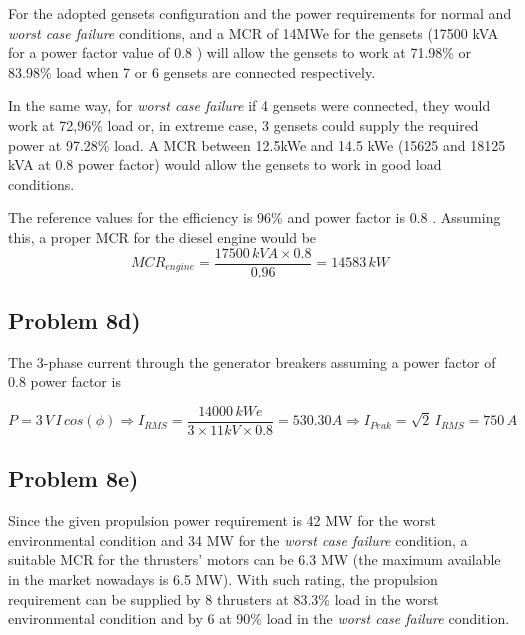 For the adopted gensets configuration and the power requirements for normal and \textit{worst case failure} conditions, and a MCR of 14MWe for the gensets (17500 kVA for a power factor value of 0.8 \cite{CatGenerators}) will allow the gensets to work at 71.98\% or 83.98\% load when 7 or 6 gensets are connected respectively. 

In the same way, for \textit{worst case failure} if 4 gensets were connected, they would work at 72,96\% load or, in extreme case, 3 gensets could supply the required power at 97.28\% load. A MCR between 12.5kWe and 14.5 kWe (15625 and 18125 kVA at 0.8 power factor) would allow the gensets to work in good load conditions. 

The reference values for the efficiency is 96\% and power factor is 0.8 \cite{CatGenerators}. Assuming this, a proper MCR for the diesel engine would be
\[
MCR_{engine}=\frac{17500 \, kV\!A \times 0.8}{0.96}=14583 \, kW
\]


\subsection{Problem 8d)}


The 3-phase current through the generator breakers assuming a power factor of 0.8 power factor is

\[
P=3\,V\,I\,cos(\phi) \Rightarrow I_{RMS}=\frac{14000 \, kW\!e}{3 \times 11 kV \times 0.8}=530.30 A \Rightarrow I_{Peak}=\sqrt{2}\,I_{RMS}=750\,A
\]

\subsection{Problem 8e)} \label{sec:8e)}
 

Since the given propulsion power requirement is 42 MW for the worst environmental condition and 34 MW for the \textit{worst case failure} condition, a suitable MCR for the thrusters' motors can be 6.3 MW (the maximum available in the market nowadays is 6.5 MW). With such rating, the propulsion requirement can be supplied by 8 thrusters at 83.3\% load in the worst environmental condition and by 6 at 90\% load in the \textit{worst case failure} condition. 

